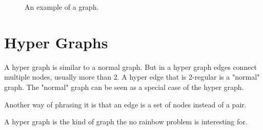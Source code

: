 \documentclass[msc,lith,english]{liuthesis}
\begin{document}
\begin{center}
\begin{figure}[h]
\centering
{}
  \caption{An example of a graph.}
  \label{figGraphExample}
\end{figure}
\end{center}

\cite[Chapter 1]{sourceDiestel}
\cite[Chapter 1]{sourceGWA}
\cite[Section 9.1]{sourceArmen}


\section{Hyper Graphs}
A hyper graph is similar to a normal graph.
But in a hyper graph edges connect multiple nodes, usually more than 2.
A hyper edge that is 2-regular is a "normal" graph.
The "normal" graph can be seen as a special case of the hyper graph.

Another way of phrasing it is that an edge is a set of nodes instead of a pair.

A hyper graph is the kind of graph the no rainbow problem is interesting for.
\end{document}
